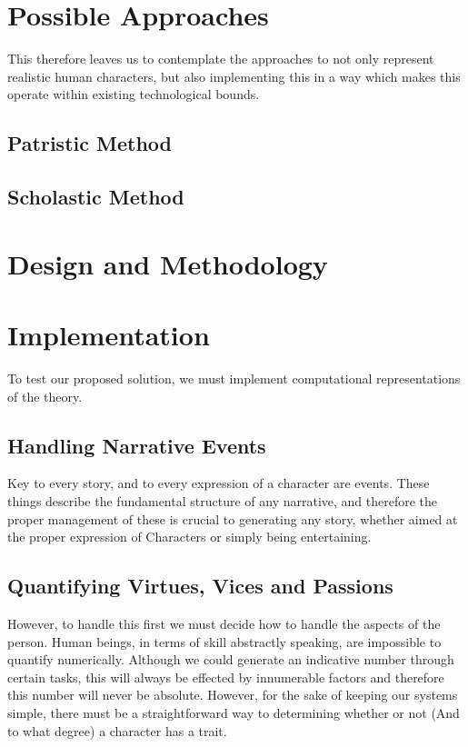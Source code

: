 \documentclass[11pt]{article}
\begin{document}
\section{Possible Approaches}
This therefore leaves us to contemplate the approaches to not only represent realistic human characters, but also implementing this in a way which makes this operate within existing technological bounds.

\subsection{Patristic Method}

\subsection{Scholastic Method}
\section{Design and Methodology}

\section{Implementation}
To test our proposed solution, we must implement computational representations of the theory. 

\subsection{Handling Narrative Events}
Key to every story, and to every expression of a character are events. These things describe the fundamental structure of any narrative, and therefore the proper management of these is crucial to generating any story, whether aimed at the proper expression of Characters or simply being entertaining. 

\subsection{Quantifying Virtues, Vices and Passions}
However, to handle this first we must decide how to handle the aspects of the person. Human beings, in terms of skill abstractly speaking, are impossible to quantify numerically. Although we could generate an indicative number through certain tasks, this will always be effected by innumerable factors and therefore this number will never be absolute. However, for the sake of keeping our systems simple, there must be a straightforward way to determining whether or not (And to what degree) a character has a trait. \\
\end{document}
